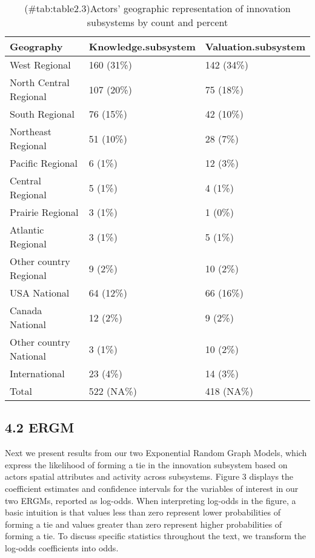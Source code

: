 \documentclass[twoside,12pt,final]{ucthesis-CA2012}
\begin{document}
\begin{ucmainmatter}
\begin{table}
\caption{(\#tab:table2.3)Actors' geographic representation of innovation subsystems by count and percent}
\centering
\begin{tabular}[t]{lll}
\toprule
Geography & Knowledge.subsystem & Valuation.subsystem\\
\midrule
West Regional & 160 (31\%) & 142 (34\%)\\
North Central Regional & 107 (20\%) & 75 (18\%)\\
South Regional & 76 (15\%) & 42 (10\%)\\
Northeast Regional & 51 (10\%) & 28 (7\%)\\
Pacific Regional & 6 (1\%) & 12 (3\%)\\
\addlinespace
Central Regional & 5 (1\%) & 4 (1\%)\\
Prairie Regional & 3 (1\%) & 1 (0\%)\\
Atlantic Regional & 3 (1\%) & 5 (1\%)\\
Other country Regional & 9 (2\%) & 10 (2\%)\\
USA National & 64 (12\%) & 66 (16\%)\\
\addlinespace
Canada National & 12 (2\%) & 9 (2\%)\\
Other country National & 3 (1\%) & 10 (2\%)\\
International & 23 (4\%) & 14 (3\%)\\
Total & 522 (NA\%) & 418 (NA\%)\\
\bottomrule
\end{tabular}
\end{table}
\hypertarget{ergm}{%
\subsection{4.2 ERGM}\label{ergm}}

Next we present results from our two Exponential Random Graph Models,
which express the likelihood of forming a tie in the innovation
subsystem based on actors\textquotesingle{} spatial attributes and activity across
subsystems. Figure 3 displays the coefficient estimates and confidence
intervals for the variables of interest in our two ERGMs, reported as
log-odds. When interpreting log-odds in the figure, a basic intuition is
that values less than zero represent lower probabilities of forming a
tie and values greater than zero represent higher probabilities of
forming a tie. To discuss specific statistics throughout the text, we
transform the log-odds coefficients into odds.

\hypertarget{organic-seed-as-a-spatially-sticky-regional-innovation-system}{%
}
\end{ucmainmatter}
\end{document}
